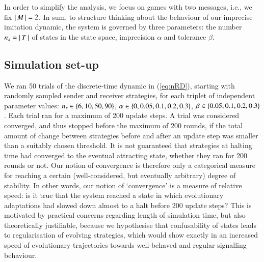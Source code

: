 \documentclass[12pt,english]{article}
\newcommand{\imprecision}{\ensuremath{\alpha}} %
\newcommand{\toler}{\ensuremath{\beta}} %
\newcommand{\ns}{\ensuremath{n_s}} %
\numberwithin{equation}{section}
\begin{document}
In order to simplify the analysis, we focus on games with two messages, i.e., we fix $\left \lvert \, M \, \right\rvert = 2$.
In sum, to structure thinking about the behaviour of our imprecise imitation dynamic, the system
is governed by three parameters: the number $\ns = \card{T}$ of states in the state space,
imprecision $\imprecision$ and tolerance $\toler$.


\subsection{Simulation set-up}
\label{sec:simulations}

We ran 50 trials of the discrete-time dynamic in (\ref{eq:nRD}), starting with randomly sampled
sender and receiver strategies, for each triplet of independent parameter values:
$\ns \in \set{6, 10, 50, 90}$, $\imprecision \in \set{0, 0.05, 0.1, 0.2, 0.3}$,
$\toler \in \set{0.05, 0.1, 0.2, 0.3}$. Each trial ran for a maximum of 200 update steps. A
trial was considered converged, and thus stopped before the maximum of 200 rounds, if the total
amount of change between strategies before and after an update step was smaller than a suitably
chosen threshold. It is not guaranteed that strategies at halting time had converged to the
eventual attracting state, whether they ran for 200 rounds or not. Our notion of convergence is
therefore only a categorical measure for reaching a certain (well-considered, but eventually
arbitrary) degree of stability. In other words, our notion of `convergence' is a measure of
relative speed: is it true that the system reached a state in which evolutionary adaptations
had slowed down almost to a halt before 200 update steps? This is motivated by practical
concerns regarding length of simulation time, but also theoretically justifiable, because we
hypothesise that confusability of states leads to regularisation of evolving strategies, which
would show exactly in an increased speed of evolutionary trajectories towards well-behaved and
regular signalling behaviour.
\end{document}
